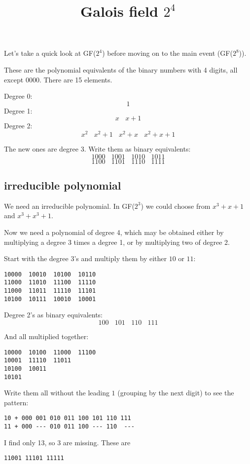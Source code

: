 \documentclass[11pt, oneside]{article}
\title{Galois field $2^4$}
\date{}
\begin{document}
\maketitle
\Large

Let's take a quick look at GF($2^4$) before moving on to the main event (GF($2^8$)).

These are the polynomial equivalents of the binary numbers with 4 digits, all except $0000$.  There are 15 elements.

Degree 0:
\[ 1 \]
Degree 1:
\[ x \ \ \ \ x + 1 \]
Degree 2:
\[ x^2 \ \ \ \ x^2 + 1 \ \ \ \ x^2 + x \ \ \ \ x^2 + x + 1 \]

The new ones are degree 3.  Write them as binary equivalents:
\[ 1000 \ \ \ \ 1001 \ \ \ \ 1010 \ \ \ \ 1011 \]
\[ 1100 \ \ \ \ 1101 \ \ \ \ 1110 \ \ \ \ 1111 \]

\subsection*{irreducible polynomial}
We need an irreducible polynomial.  In GF($2^3$) we could choose from $x^3 + x + 1$ and $x^3 + x^3 + 1$.

 Now we need a polynomial of degree 4, which may be obtained either by multiplying a degree 3 times a degree 1, or by multiplying two of degree 2.

Start with the degree 3's and multiply them by either $10$ or $11$:

\begin{verbatim}
10000  10010  10100  10110
11000  11010  11100  11110
11000  11011  11110  11101
10100  10111  10010  10001
\end{verbatim}

Degree 2's as binary equivalents:
\[ 100 \ \ \ \ 101 \ \ \ \ 110 \ \ \ \ 111 \]

And all multiplied together:

\begin{verbatim}
10000  10100  11000  11100
10001  11110  11011
10100  10011
10101
\end{verbatim}

Write them all without the leading $1$ (grouping by the next digit) to see the pattern:
\begin{verbatim}
10 + 000 001 010 011 100 101 110 111
11 + 000 --- 010 011 100 --- 110  ---
\end{verbatim}

I find only 13, so 3 are missing.  These are

\begin{verbatim}
11001 11101 11111
\end{verbatim}
\end{document}
